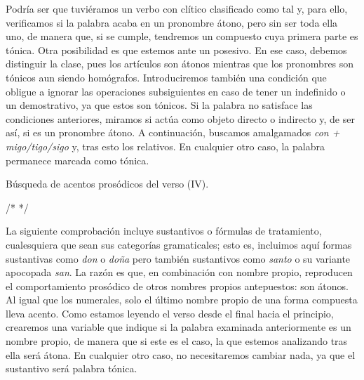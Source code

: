 Podría ser que tuviéramos un verbo con clítico clasificado como tal y, para ello, verificamos si la palabra acaba en un pronombre átono, pero sin ser toda ella uno, de manera que, si se cumple, tendremos un compuesto cuya primera parte es tónica. Otra posibilidad es que estemos ante un posesivo. En ese caso, debemos distinguir la clase, pues los artículos son átonos mientras que los pronombres son tónicos aun siendo homógrafos. Introduciremos también una condición que obligue a ignorar las operaciones subsiguientes en caso de tener un indefinido o un demostrativo, ya que estos son tónicos. Si la palabra no satisface las condiciones anteriores, miramos si actúa como objeto directo o indirecto y, de ser así, si es un pronombre átono. A continuación, buscamos amalgamados \textit{con + migo/tigo/sigo} y, tras esto los relativos. En cualquier otro caso, la palabra permanece marcada como tónica.
\begin{algorithm}[!ht]
	\caption{Búsqueda de acentos prosódicos del verso (IV).}\label{list:findps4}
 	/* /   
\end{algorithm}

La siguiente comprobación incluye sustantivos o fórmulas de tratamiento, cualesquiera que sean sus categorías gramaticales; esto es, incluimos aquí formas sustantivas como \textit{don} o \textit{doña} pero también sustantivos como \textit{santo} o su variante apocopada \textit{san}. La razón es que, en combinación con nombre propio, reproducen el comportamiento prosódico de otros nombres propios antepuestos: son átonos. Al igual que los numerales, solo el último nombre propio de una forma compuesta lleva acento. Como estamos leyendo el verso desde el final hacia el principio, crearemos una variable que indique si la palabra examinada anteriormente es un nombre propio, de manera que si este es el caso, la que estemos analizando tras ella será átona. En cualquier otro caso, no necesitaremos  cambiar nada, ya que el sustantivo será palabra tónica.

